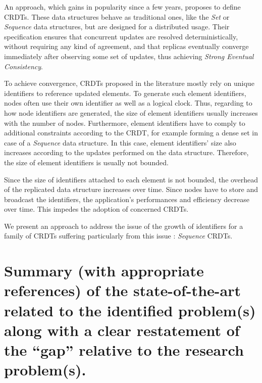 \documentclass{article}
\begin{document}
An approach, which gains in popularity since a few years, proposes to define \acfp{CRDT}.
These data structures behave as traditional ones, like the \emph{Set} or \emph{Sequence} data structures, but are designed for a distributed usage.
Their specification ensures that concurrent updates are resolved deterministically, without requiring any kind of agreement, and that replicas eventually converge immediately after observing some set of updates,
thus achieving \emph{Strong Eventual Consistency}.

To achieve convergence, \acp{CRDT} proposed in the literature mostly rely on unique identifiers to reference updated elements.
To generate such element identifiers, nodes often use their own identifier as well as a logical clock.
Thus, regarding to how node identifiers are generated, the size of element identifiers usually increases with the number of nodes.
Furthermore, element identifiers have to comply to additional constraints according to the \ac{CRDT}, for example forming a dense set in case of a \emph{Sequence} data structure.
In this case, element identifiers' size also increases according to the updates performed on the data structure.
Therefore, the size of element identifiers is usually not bounded.

Since the size of identifiers attached to each element is not bounded, the overhead of the replicated data structure increases over time.
Since nodes have to store and broadcast the identifiers, the application's performances and efficiency decrease over time.
This impedes the adoption of concerned \acp{CRDT}.

We present an approach to address the issue of the growth of identifiers for a family of \acp{CRDT} suffering particularly from this issue : \emph{Sequence} \acp{CRDT}.

\section{Summary (with appropriate references) of the state-of-the-art related to the identified problem(s) along with a clear restatement of the “gap” relative to the research problem(s).}

\end{document}
